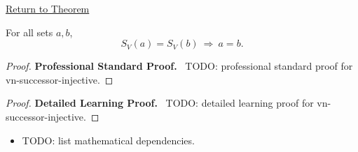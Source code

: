 \newpage
{}
\label{prf:vn-successor-injective}

\begin{remark*}[Return]
\hyperref[prop:vn-successor-injective]{Return to Theorem}
\end{remark*}

\begin{theorem*}
For all sets $a,b$,
\[
S_V(a)=S_V(b)\ \Rightarrow\ a=b.
\]
\end{theorem*}

\begin{proof}
\textbf{Professional Standard Proof.}~
TODO: professional standard proof for vn-successor-injective.
\end{proof}

\begin{proof}
\textbf{Detailed Learning Proof.}~
TODO: detailed learning proof for vn-successor-injective.
\end{proof}

\begin{remark*}
\end{remark*}

\begin{dependencies}
\begin{itemize}
  \item TODO: list mathematical dependencies.
\end{itemize}
\end{dependencies}

\clearpage
